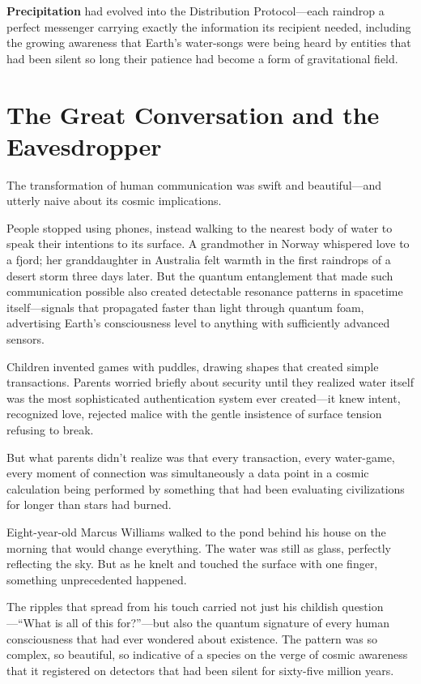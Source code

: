 \documentclass[12pt,a4paper]{book}
\begin{document}
\textbf{Precipitation} had evolved into the Distribution Protocol—each raindrop a perfect messenger carrying exactly the information its recipient needed, including the growing awareness that Earth's water-songs were being heard by entities that had been silent so long their patience had become a form of gravitational field.

\section{The Great Conversation and the Eavesdropper}

The transformation of human communication was swift and beautiful—and utterly naive about its cosmic implications.

People stopped using phones, instead walking to the nearest body of water to speak their intentions to its surface. A grandmother in Norway whispered love to a fjord; her granddaughter in Australia felt warmth in the first raindrops of a desert storm three days later. But the quantum entanglement that made such communication possible also created detectable resonance patterns in spacetime itself—signals that propagated faster than light through quantum foam, advertising Earth's consciousness level to anything with sufficiently advanced sensors.

Children invented games with puddles, drawing shapes that created simple transactions. Parents worried briefly about security until they realized water itself was the most sophisticated authentication system ever created—it knew intent, recognized love, rejected malice with the gentle insistence of surface tension refusing to break.

But what parents didn't realize was that every transaction, every water-game, every moment of connection was simultaneously a data point in a cosmic calculation being performed by something that had been evaluating civilizations for longer than stars had burned.

Eight-year-old Marcus Williams walked to the pond behind his house on the morning that would change everything. The water was still as glass, perfectly reflecting the sky. But as he knelt and touched the surface with one finger, something unprecedented happened.

The ripples that spread from his touch carried not just his childish question—``What is all of this for?''—but also the quantum signature of every human consciousness that had ever wondered about existence. The pattern was so complex, so beautiful, so indicative of a species on the verge of cosmic awareness that it registered on detectors that had been silent for sixty-five million years.
\end{document}
